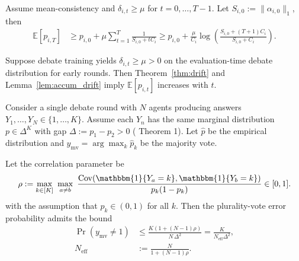 \begin{lemma}
\label{lem:accum_drift}
Assume mean-consistency and \(\delta_{i,t}\ge \mu\) for \(t=0,\dots,T-1\).
Let \(S_{i,0}:=\|\alpha_{i,0}\|_1\),
then
\begin{equation}
\begin{aligned}
\mathbb{E}[p_{i,T}]
&\ge p_{i,0}
+ \mu\sum_{t=1}^{T}\frac{1}{S_{i,0}+tC_i}
\ge p_{i,0}
+ \frac{\mu}{C_i}\log\!\left(\frac{S_{i,0}+(T+1)C_i}{S_{i,0}+C_i}\right).
\end{aligned}
\label{eq:accum_drift_main}
\end{equation}
\end{lemma}

\begin{proposition}
\label{prop:training_adv}
Suppose debate training yields \(\delta_{i,t}\ge \mu>0\) on the evaluation-time debate distribution for early rounds.
Then Theorem~\ref{thm:drift} and Lemma~\ref{lem:accum_drift} imply \(\mathbb{E}[p_{i,t}]\) increases with \(t\).
\end{proposition}

\begin{lemma}
\label{lem:corr_neff}
Consider a single debate round with $N$ agents producing answers
$Y_1,\dots,Y_N \in \{1,\dots,K\}$.
Assume each $Y_n$ has the same marginal distribution $p\in\Delta^K$
with gap $\Delta := p_1-p_2>0$ (\cite{choi2025debate} Theorem 1).
Let $\hat p$ be the empirical distribution and
$y_{\mathrm{mv}}=\arg\max_k \hat p_k$ be the majority vote.

Let the correlation parameter be
\[
\rho := \max_{k\in[K]}\ \max_{a\neq b}\ 
\frac{\mathrm{Cov}(\mathbbm{1}\{Y_a=k\},\mathbbm{1}\{Y_b=k\})}{p_k(1-p_k)} \in [0,1].
\]
with the assumption that $p_k \in (0,1)$ for all $k$.
Then the plurality-vote error probability admits the bound
\[
\begin{aligned}
\Pr(y_{\mathrm{mv}}\neq 1)
&\le \frac{K(1+(N-1)\rho)}{N\,\Delta^2}
= \frac{K}{N_{\mathrm{eff}}\Delta^2},\\
N_{\mathrm{eff}} &:= \frac{N}{1+(N-1)\rho}.
\end{aligned}
\]
\end{lemma}

